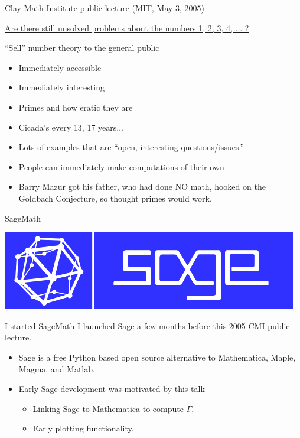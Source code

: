 \documentclass{beamer}
\begin{document}
\begin{frame}{Clay Math Institute public lecture (MIT, May 3, 2005)}

  \href{http://www.claymath.org/library/public\_lectures/mazur\_riemann\_hypothesis.pdf}{\underline{Are there still unsolved problems about the numbers 1, 2, 3, 4, ... ?}}
  \vfill

  \begin{block}{``Sell'' number theory to the general public}
    \begin{itemize}
      \item   Immediately accessible
      \item   Immediately interesting
      \item   Primes and how eratic they are
      \item   Cicada's every 13, 17 years...
      \item   Lots of examples that are ``open, interesting questions/issues.''
      \item   People can immediately make computations of their \underline{own}
      \item   Barry Mazur got his father, who had done NO
            math, hooked on the Goldbach Conjecture, so thought
            primes would work.
    \end{itemize}
  \end{block}
\end{frame}

\begin{frame}{SageMath}
  \vfill
  \begin{center}
    \includegraphics[width=.7\textwidth]{pics/sage-logo.png}
  \end{center}
  \vfill

  \begin{block}{I started SageMath}
    I launched Sage a few months before this 2005 CMI public lecture.
    \begin{itemize}
      \item Sage is a free Python based open source alternative to Mathematica, Maple, Magma, and Matlab.
      \item Early Sage development was motivated by this talk
            \begin{itemize}
              \item Linking Sage to Mathematica to compute $\Gamma$.
              \item Early plotting functionality.
            \end{itemize}
    \end{itemize}
  \end{block}
\end{frame}
\end{document}
